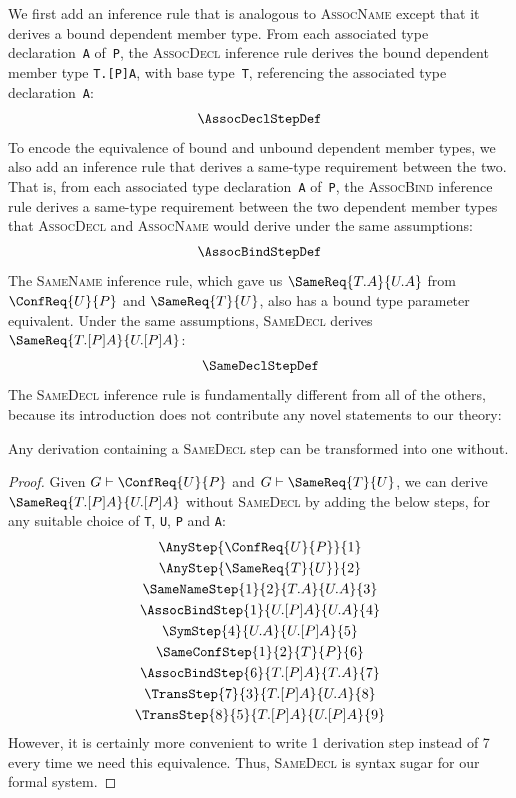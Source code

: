 \documentclass[../generics]{subfiles}
\begin{document}
We first add an inference rule that is analogous to \textsc{AssocName} except that it derives a bound dependent member type. From each associated type declaration~\texttt{A} of~\texttt{P}, the \textsc{AssocDecl} inference rule derives the bound dependent member type \texttt{T.[P]A}, with base type~\texttt{T}, referencing the associated type declaration~\texttt{A}:
\begin{gather*}
\AssocDeclStepDef
\end{gather*}
To encode the equivalence of bound and unbound dependent member types, we also add an inference rule that derives a same-type requirement between the two. That is, from each associated type declaration~\texttt{A} of~\texttt{P}, the \textsc{AssocBind} inference rule derives a same-type requirement between the two dependent member types that \textsc{AssocDecl} and \textsc{AssocName} would derive under the same assumptions:
\begin{gather*}
\AssocBindStepDef
\end{gather*}
The \textsc{SameName} inference rule, which gave us $\SameReq{T.A}{U.A}$ from $\ConfReq{U}{P}$ and $\SameReq{T}{U}$, also has a bound type parameter equivalent. Under the same assumptions, \textsc{SameDecl} derives $\SameReq{T.[P]A}{U.[P]A}$:
\begin{gather*}
\SameDeclStepDef
\end{gather*}
The \textsc{SameDecl} inference rule is fundamentally different from all of the others, because its introduction does not contribute any novel statements to our theory:
\begin{proposition}
Any derivation containing a \textsc{SameDecl} step can be transformed into one without.
\end{proposition}
\begin{proof}
Given $G\vdash\ConfReq{U}{P}$ and $G\vdash\SameReq{T}{U}$, we can derive $\SameReq{T.[P]A}{U.[P]A}$ without \textsc{SameDecl} by adding the below steps, for any suitable choice of \texttt{T}, \texttt{U}, \texttt{P} and \texttt{A}:
\begin{gather*}
\AnyStep{\ConfReq{U}{P}}{1}\\
\AnyStep{\SameReq{T}{U}}{2}\\
\SameNameStep{1}{2}{T.A}{U.A}{3}\\
\AssocBindStep{1}{U.[P]A}{U.A}{4}\\
\SymStep{4}{U.A}{U.[P]A}{5}\\
\SameConfStep{1}{2}{T}{P}{6}\\
\AssocBindStep{6}{T.[P]A}{T.A}{7}\\
\TransStep{7}{3}{T.[P]A}{U.A}{8}\\
\TransStep{8}{5}{T.[P]A}{U.[P]A}{9}
\end{gather*}
However, it is certainly more convenient to write 1 derivation step instead of 7 every time we need this equivalence. Thus, \textsc{SameDecl} is syntax sugar for our formal system.
\end{proof}
\end{document}

